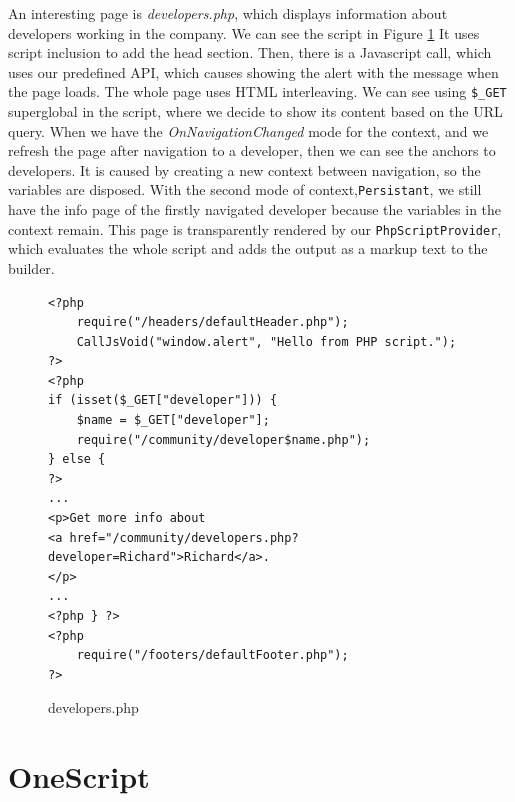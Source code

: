 \par
An interesting page is \textit{developers.php}, which displays information about developers working in the company.
We can see the script in Figure \ref{img25:developer}
It uses script inclusion to add the head section.
Then, there is a Javascript call, which uses our predefined API, which causes showing the alert with the message when the page loads.
The whole page uses HTML interleaving.
We can see using \texttt{\$\_GET} superglobal in the script, where we decide to show its content based on the URL query.
When we have the \textit{OnNavigationChanged} mode for the context, and we refresh the page after navigation to a developer, then we can see the anchors to developers.
It is caused by creating a new context between navigation, so the variables are disposed.
With the second mode of context,\texttt{Persistant}, we still have the info page of the firstly navigated developer because the variables in the context remain.
This page is transparently rendered by our \texttt{PhpScriptProvider}, which evaluates the whole script and adds the output as a markup text to the builder.
\par
\begin{figure}
\begin{lstlisting}
<?php
    require("/headers/defaultHeader.php");
    CallJsVoid("window.alert", "Hello from PHP script.");
?>
<?php
if (isset($_GET["developer"])) { 
    $name = $_GET["developer"];
    require("/community/developer$name.php");
} else {
?>
...
<p>Get more info about 
<a href="/community/developers.php?developer=Richard">Richard</a>.
</p>
...
<?php } ?>
<?php
    require("/footers/defaultFooter.php");
?>
\end{lstlisting}
\caption{developers.php}
\label{img25:developer}
\end{figure}

\section{OneScript}

